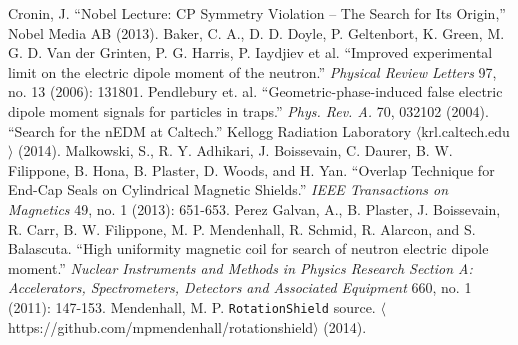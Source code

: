 \documentclass[twocolumn,aps,prb,citeautoscript]{revtex4-1}
\begin{document}
\begin{thebibliography}{}
 Cronin, J. ``Nobel Lecture: CP Symmetry Violation – The Search
for Its Origin,'' Nobel Media AB (2013).
 Baker, C. A., D. D. Doyle, P. Geltenbort, K. Green, M. G. D. Van der Grinten, P. G. Harris, P. Iaydjiev et al. ``Improved experimental limit on the electric dipole moment of the neutron.'' \textit{Physical Review Letters} 97, no. 13 (2006): 131801.
 Pendlebury et. al. ``Geometric-phase-induced false electric dipole moment signals for particles in traps.'' \textit{Phys. Rev. A.} 70, 032102 (2004).
 ``Search for the nEDM at Caltech.'' Kellogg Radiation Laboratory
$\langle$krl.caltech.edu$\rangle$ (2014).
 Malkowski, S., R. Y. Adhikari, J. Boissevain, C. Daurer, B. W. Filippone, B. Hona, B. Plaster, D. Woods, and H. Yan. ``Overlap Technique for End-Cap Seals on Cylindrical Magnetic Shields.'' \textit{IEEE Transactions on Magnetics} 49, no. 1 (2013): 651-653.
 Perez Galvan, A., B. Plaster, J. Boissevain, R. Carr, B. W. Filippone, M. P. Mendenhall, R. Schmid, R. Alarcon, and S. Balascuta. ``High uniformity magnetic coil for search of neutron electric dipole moment.'' \textit{Nuclear Instruments and Methods in Physics Research Section A: Accelerators, Spectrometers, Detectors and Associated Equipment} 660, no. 1 (2011): 147-153.
 Mendenhall, M. P. \texttt{RotationShield} source. $\langle$https://github.com/mpmendenhall/rotationshield$\rangle$ (2014).
\end{thebibliography}
\end{document}
